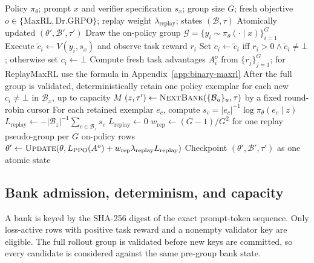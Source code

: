 \begin{algorithm}[H]
  \caption{One ReplayMaxRL optimizer update}
  \label{alg:verified-replay-update}
  \small
  \begin{algorithmic}[1]
    \REQUIRE Policy $\pi_\theta$; prompt $x$ and verifier specification
      $s_x$; group size $G$; fresh objective $o\in\{\mathrm{MaxRL},\mathrm{Dr.GRPO}\}$; replay weight $\lambda_{\mathrm{replay}}$;
      states $(\mathcal B,\tau)$
    \ENSURE Atomically updated $(\theta',\mathcal B',\tau')$
    \STATE Draw the on-policy group
      $\mathcal G=\{y_i\sim\pi_\theta(\cdot\mid x)\}_{i=1}^G$
      \STATE Execute $\widetilde c_i\gets V(y_i,s_x)$ and observe task
        reward $r_i$
      \STATE Set $c_i\gets\widetilde c_i$ iff
        $r_i>0\wedge\widetilde c_i\ne\bot$; otherwise set $c_i\gets\bot$
    \ENDFOR
    \STATE Compute fresh task advantages $A_i^{o}$ from $\{r_j\}_{j=1}^G$; for ReplayMaxRL use the formula in Appendix~\ref{app:binary-maxrl}
    \STATE After the full group is validated, deterministically retain one
      policy exemplar for each new $c_i\ne\bot$ in $\mathcal B_x$, up to
      capacity $M$
    \STATE $(z,\tau')\gets\textsc{NextBank}
      (\{\mathcal B_u\}_u,\tau)$ by a fixed round-robin cursor
      \STATE For each retained exemplar $e_c$, compute
        $s_c=|e_c|^{-1}\log\pi_\theta(e_c\mid z)$
      \STATE $L_{\mathrm{replay}}\gets-|\mathcal B_z|^{-1}
        \sum_{c\in\mathcal B_z}s_c$
    \ELSE
      \STATE $L_{\mathrm{replay}}\gets0$
    \ENDIF
    \STATE $w_{\mathrm{rep}}\gets(G-1)/G^2$ for one replay
      pseudo-group per $G$ on-policy rows
    \STATE $\theta'\gets\textsc{Update}
      (\theta,L_{\mathrm{PPO}}(A^{o})
      +w_{\mathrm{rep}}\lambda_{\mathrm{replay}}L_{\mathrm{replay}})$
    \STATE Checkpoint $(\theta',\mathcal B',\tau')$ as one atomic state
\end{algorithmic}
\end{algorithm}

\subsection{Bank admission, determinism, and capacity}
\label{app:algorithm-bank}

A bank is keyed by the SHA-256 digest of the exact prompt-token sequence.
Only loss-active rows with positive task reward and a nonempty validator key
are eligible. The full rollout group is validated before new keys are
committed, so every candidate is considered against the same pre-group bank
state.

